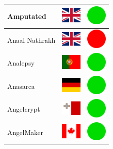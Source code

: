 \documentclass[12pt, a4paper, twoside]{report}
\begin{document}
\begin{center}
\begin{longtable}{|p{5cm}|p{2cm}|p{2cm}|}
 Amputated                                                  & \includegraphics[width=1cm]{../img/flags/gb} &   \includegraphics[width=1cm]{../likes/y} \\ \hline
 Anaal Nathrakh                                             & \includegraphics[width=1cm]{../img/flags/gb} &   \includegraphics[width=1cm]{../likes/n} \\ \hline
 Analepsy                                                   & \includegraphics[width=1cm]{../img/flags/pt} &   \includegraphics[width=1cm]{../likes/y} \\ \hline
 Anasarca                                                   & \includegraphics[width=1cm]{../img/flags/de} &   \includegraphics[width=1cm]{../likes/y} \\ \hline
 Angelcrypt                                                 & \includegraphics[width=1cm]{../img/flags/mt} &   \includegraphics[width=1cm]{../likes/y} \\ \hline
 AngelMaker                                                 & \includegraphics[width=1cm]{../img/flags/ca} &   \includegraphics[width=1cm]{../likes/y} \\ \hline

\end{longtable}
\end{center}
\end{document}
